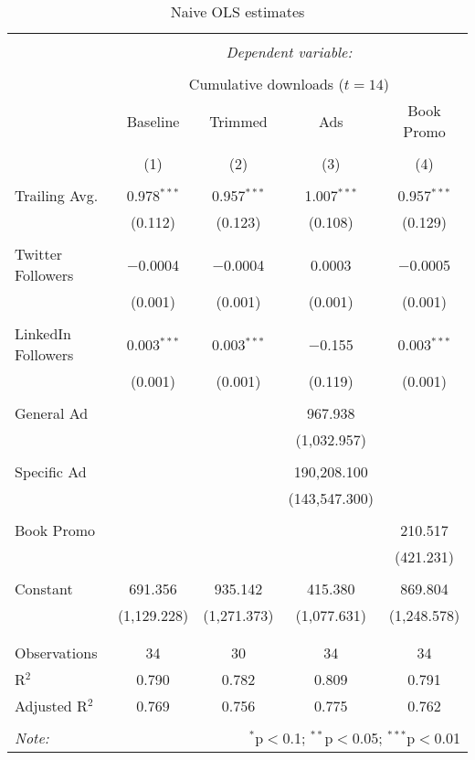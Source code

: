 
\begin{table}[!htbp] \centering 
  \caption{Naive OLS estimates} 
  \label{} 
\begin{tabular}{@{\extracolsep{5pt}}lcccc} 
\\[-1.8ex]\hline 
\hline \\[-1.8ex] 
 & \multicolumn{4}{c}{\textit{Dependent variable:}} \\ 
\cline{2-5} 
\\[-1.8ex] & \multicolumn{4}{c}{Cumulative downloads ($t=14$)} \\ 
 & Baseline & Trimmed & Ads & Book Promo \\ 
\\[-1.8ex] & (1) & (2) & (3) & (4)\\ 
\hline \\[-1.8ex] 
 Trailing Avg. & 0.978$^{***}$ & 0.957$^{***}$ & 1.007$^{***}$ & 0.957$^{***}$ \\ 
  & (0.112) & (0.123) & (0.108) & (0.129) \\ 
  & & & & \\ 
 Twitter Followers & $-$0.0004 & $-$0.0004 & 0.0003 & $-$0.0005 \\ 
  & (0.001) & (0.001) & (0.001) & (0.001) \\ 
  & & & & \\ 
 LinkedIn Followers & 0.003$^{***}$ & 0.003$^{***}$ & $-$0.155 & 0.003$^{***}$ \\ 
  & (0.001) & (0.001) & (0.119) & (0.001) \\ 
  & & & & \\ 
 General Ad &  &  & 967.938 &  \\ 
  &  &  & (1,032.957) &  \\ 
  & & & & \\ 
 Specific Ad &  &  & 190,208.100 &  \\ 
  &  &  & (143,547.300) &  \\ 
  & & & & \\ 
 Book Promo &  &  &  & 210.517 \\ 
  &  &  &  & (421.231) \\ 
  & & & & \\ 
 Constant & 691.356 & 935.142 & 415.380 & 869.804 \\ 
  & (1,129.228) & (1,271.373) & (1,077.631) & (1,248.578) \\ 
  & & & & \\ 
\hline \\[-1.8ex] 
Observations & 34 & 30 & 34 & 34 \\ 
R$^{2}$ & 0.790 & 0.782 & 0.809 & 0.791 \\ 
Adjusted R$^{2}$ & 0.769 & 0.756 & 0.775 & 0.762 \\ 
\hline 
\hline \\[-1.8ex] 
\textit{Note:}  & \multicolumn{4}{r}{$^{*}$p$<$0.1; $^{**}$p$<$0.05; $^{***}$p$<$0.01} \\ 
\end{tabular} 
\end{table} 
